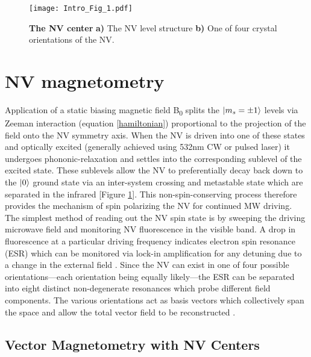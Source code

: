\begin{figure}[t!]
\centering
\texttt{[image: Intro\_Fig\_1.pdf]}  
\caption{\textbf{The NV center} \textbf{a)} The NV level structure \textbf{b)} One of four crystal orientations of the NV.}
\label{Fig_one}
\end{figure}

\section{NV magnetometry} %

Application of a static biasing magnetic field B\textsubscript{0} splits the $\ket{m_s = \pm1}$ levels via Zeeman interaction (equation \ref{hamiltonian}) proportional to the projection of the field onto the NV symmetry axis. When the NV is driven into one of these states and optically excited (generally achieved using 532nm CW or pulsed laser) it undergoes phononic-relaxation and settles into the corresponding sublevel of the excited state. These sublevels allow the NV to preferentially decay back down to the $\ket{0}$ ground state via an inter-system crossing and metastable state which are separated in the infrared [Figure \ref{Fig_one}]. This non-spin-conserving process therefore provides the mechanism of spin polarizing the NV for continued MW driving. The simplest method of reading out the NV spin state is by sweeping the driving microwave field and monitoring NV fluorescence in the visible band. A drop in fluorescence at a particular driving frequency indicates electron spin resonance (ESR) which can be monitored via lock-in amplification for any detuning due to a change in the external field \cite{jensen2017magnetometry,rondin2014magnetometry}. Since the NV can exist in one of four possible orientations---each orientation being equally likely---the ESR can be separated into eight distinct non-degenerate resonances which probe different field components. The various orientations act as basis vectors which collectively span the space and allow the total vector field to be reconstructed \cite{jensen2017magnetometry}. 

\subsection{Vector Magnetometry with NV Centers}\label{ch1:vect}

